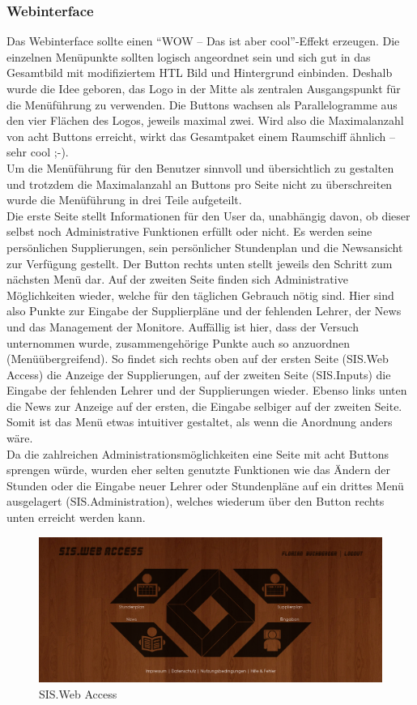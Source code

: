 \subsubsection{Webinterface}
\label{sec:content_draft_design_web}
Das Webinterface sollte einen \enquote{WOW – Das ist aber cool}-Effekt erzeugen. Die einzelnen Menüpunkte sollten logisch angeordnet sein und sich gut in das Gesamtbild mit modifiziertem HTL Bild und Hintergrund einbinden. Deshalb wurde die Idee geboren, das Logo in der Mitte als zentralen Ausgangspunkt für die Menüführung zu verwenden. Die Buttons wachsen als Parallelogramme aus den vier Flächen des Logos, jeweils maximal zwei. Wird also die Maximalanzahl von acht Buttons erreicht, wirkt das Gesamtpaket einem Raumschiff ähnlich – sehr cool ;-).\\
Um die Menüführung für den Benutzer sinnvoll und übersichtlich zu gestalten und trotzdem die Maximalanzahl an Buttons pro Seite nicht zu überschreiten wurde die Menüführung in drei Teile aufgeteilt.\\
Die erste Seite stellt Informationen für den User da, unabhängig davon, ob dieser selbst noch Administrative Funktionen erfüllt oder nicht. Es werden seine persönlichen Supplierungen, sein persönlicher Stundenplan und die Newsansicht zur Verfügung gestellt. Der Button rechts unten stellt jeweils den Schritt zum nächsten Menü dar. Auf der zweiten Seite finden sich Administrative Möglichkeiten wieder, welche für den täglichen Gebrauch nötig sind. Hier sind also Punkte zur Eingabe der Supplierpläne und der fehlenden Lehrer, der News und das Management der Monitore. Auffällig ist hier, dass der Versuch unternommen wurde, zusammengehörige Punkte auch so anzuordnen (Menüübergreifend). So findet sich rechts oben auf der ersten Seite (SIS.Web Access) die Anzeige der Supplierungen, auf der zweiten Seite (SIS.Inputs) die Eingabe der fehlenden Lehrer und der Supplierungen wieder. Ebenso links unten die News zur Anzeige auf der ersten, die Eingabe selbiger auf der zweiten Seite. Somit ist das Menü etwas intuitiver gestaltet, als wenn die Anordnung anders wäre.\\
Da die zahlreichen Administrationsmöglichkeiten eine Seite mit acht Buttons sprengen würde, wurden eher selten genutzte Funktionen wie das Ändern der Stunden oder die Eingabe neuer Lehrer oder Stundenpläne auf ein drittes Menü ausgelagert (SIS.Administration), welches wiederum über den Button rechts unten erreicht werden kann.\\
\begin{figure}[H]
\centering
\includegraphics[keepaspectratio=true, width=14cm]{images/screenshots/web-access_nohover.png}
\caption{SIS.Web Access}
\label{fig:content_draft_design_webaccess}
\end{figure}
